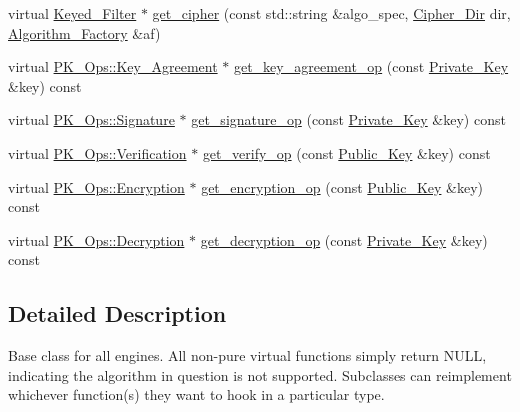 \begin{DoxyCompactItemize}
\item 
virtual \hyperlink{classBotan_1_1Keyed__Filter}{Keyed\-\_\-\-Filter} $\ast$ \hyperlink{classBotan_1_1Engine_a718a001a146a9cd134e816920bb6f635}{get\-\_\-cipher} (const std\-::string \&algo\-\_\-spec, \hyperlink{namespaceBotan_ad9d14ffdc73fc19966421979b32ee759}{Cipher\-\_\-\-Dir} dir, \hyperlink{classBotan_1_1Algorithm__Factory}{Algorithm\-\_\-\-Factory} \&af)
\item 
virtual \hyperlink{classBotan_1_1PK__Ops_1_1Key__Agreement}{P\-K\-\_\-\-Ops\-::\-Key\-\_\-\-Agreement} $\ast$ \hyperlink{classBotan_1_1Engine_a10e4b60b0eaf1a7fd08dfffc3786e9eb}{get\-\_\-key\-\_\-agreement\-\_\-op} (const \hyperlink{classBotan_1_1Private__Key}{Private\-\_\-\-Key} \&key) const 
\item 
virtual \hyperlink{classBotan_1_1PK__Ops_1_1Signature}{P\-K\-\_\-\-Ops\-::\-Signature} $\ast$ \hyperlink{classBotan_1_1Engine_a2a7386598110cd82b1f904d5a9d5ff60}{get\-\_\-signature\-\_\-op} (const \hyperlink{classBotan_1_1Private__Key}{Private\-\_\-\-Key} \&key) const 
\item 
virtual \hyperlink{classBotan_1_1PK__Ops_1_1Verification}{P\-K\-\_\-\-Ops\-::\-Verification} $\ast$ \hyperlink{classBotan_1_1Engine_aef518bab2c4656d3982177eac5608692}{get\-\_\-verify\-\_\-op} (const \hyperlink{classBotan_1_1Public__Key}{Public\-\_\-\-Key} \&key) const 
\item 
virtual \hyperlink{classBotan_1_1PK__Ops_1_1Encryption}{P\-K\-\_\-\-Ops\-::\-Encryption} $\ast$ \hyperlink{classBotan_1_1Engine_a5671e04df51e2ee2f88a2c49ad022d55}{get\-\_\-encryption\-\_\-op} (const \hyperlink{classBotan_1_1Public__Key}{Public\-\_\-\-Key} \&key) const 
\item 
virtual \hyperlink{classBotan_1_1PK__Ops_1_1Decryption}{P\-K\-\_\-\-Ops\-::\-Decryption} $\ast$ \hyperlink{classBotan_1_1Engine_ac728a3c7efd6aeaf729792246b6c8ae9}{get\-\_\-decryption\-\_\-op} (const \hyperlink{classBotan_1_1Private__Key}{Private\-\_\-\-Key} \&key) const 
\end{DoxyCompactItemize}


\subsection{Detailed Description}
Base class for all engines. All non-\/pure virtual functions simply return N\-U\-L\-L, indicating the algorithm in question is not supported. Subclasses can reimplement whichever function(s) they want to hook in a particular type. 

